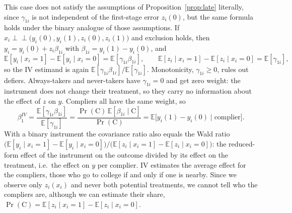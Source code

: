 \documentclass[11pt,a4paper]{article}
\newcommand{\E}{\mathbb{E}}
\newcommand{\indep}{\perp\!\!\!\perp}
\begin{document}
This case does not satisfy the assumptions of Proposition~\ref{prop:late} literally, since $\gamma_{1i}$ is not independent of the first-stage error $z_i(0)$, but the same formula holds under the binary analogue of those assumptions. If $x_i\indep\big(y_i(0),y_i(1),z_i(0),z_i(1)\big)$ and exclusion holds, then $y_i=y_i(0)+z_i\beta_{1i}$ with $\beta_{1i}=y_i(1)-y_i(0)$, and
\[
\E[y_i\mid x_i=1]-\E[y_i\mid x_i=0]=\E[\gamma_{1i}\beta_{1i}],\qquad \E[z_i\mid x_i=1]-\E[z_i\mid x_i=0]=\E[\gamma_{1i}],
\]
so the IV estimand is again $\E[\gamma_{1i}\beta_{1i}]/\E[\gamma_{1i}]$. Monotonicity, $\gamma_{1i}\geq0$, rules out defiers. Always-takers and never-takers have $\gamma_{1i}=0$ and get zero weight: the instrument does not change their treatment, so they carry no information about the effect of $z$ on $y$. Compliers all have the same weight, so
\[
\beta_1^{IV}=\frac{\E[\gamma_{1i}\beta_{1i}]}{\E[\gamma_{1i}]}=\frac{\Pr(\text{C})\,\E[\beta_{1i}\mid\text{C}]}{\Pr(\text{C})}=\E\big[y_i(1)-y_i(0)\mid\text{complier}\big].
\]
With a binary instrument the covariance ratio also equals the Wald ratio $\big(\E[y_i\mid x_i=1]-\E[y_i\mid x_i=0]\big)\big/\big(\E[z_i\mid x_i=1]-\E[z_i\mid x_i=0]\big)$: the reduced-form effect of the instrument on the outcome divided by its effect on the treatment, i.e.\ the effect on $y$ per complier. IV estimates the average effect for the compliers, those who go to college if and only if one is nearby. Since we observe only $z_i(x_i)$ and never both potential treatments, we cannot tell who the compliers are, although we can estimate their share, $\Pr(\text{C})=\E[z_i\mid x_i=1]-\E[z_i\mid x_i=0]$.
\end{document}
